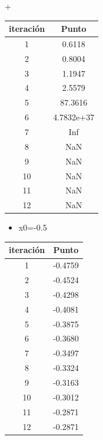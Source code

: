 +\documentclass{udpreport}
\begin{document}
\begin{enumerate}
\begin{enumerate}
\begin{table}[H]
\begin{tabular} { |c|c|}
        \hline
        iteración  &  Punto\\
        \hline
        1 &  0.6118        \\
         \hline
        2 &   0.8004       \\
         \hline
        3 &   1.1947       \\
         \hline
        4 &   2.5579      \\
         \hline
        5 &  87.3616      \\
         \hline
        6 & 4.7832e+37     \\
         \hline
        7 &  Inf         \\
         \hline
        8 &  NaN       \\
         \hline
        9 & NaN      \\
         \hline
        10 &   NaN       \\
         \hline
        11 &  NaN        \\
         \hline
        12 &   NaN        \\
        \hline
        
        \end{tabular}
    \end{table}
 
 \begin{itemize}
 \newpage
\item x0=-0.5
\end{itemize}
\begin{table}[H]
    \centering
        \begin{tabular} { |c|c|}
        
        \hline
        iteración  &  Punto\\
        \hline
        1 & -0.4759        \\
         \hline
        2 &  -0.4524        \\
         \hline
        3 &  -0.4298       \\
         \hline
        4 &   -0.4081      \\
         \hline
        5 &  -0.3875       \\
         \hline
        6 &   -0.3680     \\
         \hline
        7 &  -0.3497      \\
         \hline
        8 &  -0.3324       \\
         \hline
        9 &  -0.3163       \\
         \hline
        10 &  -0.3012       \\
         \hline
        11 &  -0.2871     \\
         \hline
        12 &  -0.2871       \\
        \hline
        \end{tabular}
\end{table}


\end{enumerate}
\end{enumerate}
\end{document}
